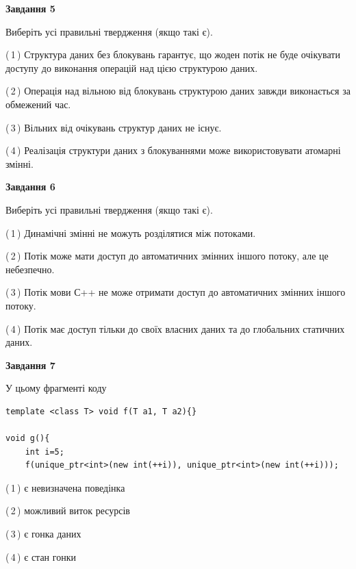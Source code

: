 \documentclass[12pt, ukrainian]{article}
\begin{document}
\begin {large}
{\begin{center}
\textbf{Завдання 5}
\end{center}

Виберіть усі правильні твердження (якщо такі є).\par
\vspace{2mm}

(\,1\,) Структура даних без блокувань гарантує, що жоден потік не буде очікувати доступу до виконання операцій над цією структурою даних.%

(\,2\,) Операція над вільною від блокувань структурою даних завжди виконається за обмежений час.%

(\,3\,) Вільних від очікувань структур даних не існує.%

(\,4\,) Реалізація структури даних з блокуваннями може використовувати атомарні змінні.%
\newpage


\begin{center}
\textbf{Завдання 6}
\end{center}

Виберіть усі правильні твердження (якщо такі є).\par
\vspace{2mm}

(\,1\,) Динамічні змінні не можуть розділятися між потоками.%

(\,2\,) Потік може мати доступ до автоматичних змінних іншого потоку, але це небезпечно.%

(\,3\,) Потік мови С++ не може отримати доступ до автоматичних змінних іншого потоку.%

(\,4\,) Потік має доступ тільки до своїх власних даних та до глобальних статичних даних.%


\begin{center}
\textbf{Завдання 7}
\end{center}

У цьому фрагменті коду
\begin{verbatim}
template <class T> void f(T a1, T a2){}

void g(){
    int i=5;
    f(unique_ptr<int>(new int(++i)), unique_ptr<int>(new int(++i)));
\end{verbatim}

(\,1\,) є невизначена поведінка%

(\,2\,) можливий виток ресурсів%

(\,3\,) є гонка даних%

(\,4\,) є стан гонки%

}
\end {large}

\vspace{4mm}
\newpage
\end{document}

